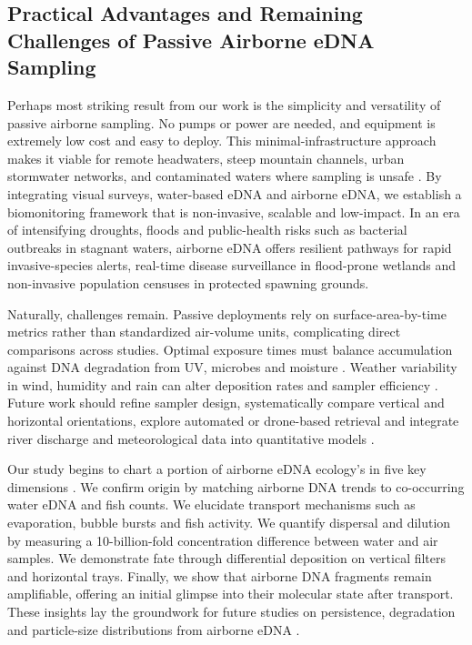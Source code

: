 \documentclass{article}
\begin{document}
\subsection{Practical Advantages and Remaining Challenges of Passive Airborne eDNA Sampling}
Perhaps most striking result from our work is the simplicity and versatility of passive airborne sampling. No pumps or power are needed, and equipment is extremely low cost and easy to deploy. This minimal-infrastructure approach makes it viable for remote headwaters, steep mountain channels, urban stormwater networks, and contaminated waters where sampling is unsafe \cite{harrison2019,bagley2019}. By integrating visual surveys, water-based eDNA and airborne eDNA, we establish a biomonitoring framework that is non-invasive, scalable and low-impact. In an era of intensifying droughts, floods and public-health risks such as bacterial outbreaks in stagnant waters, airborne eDNA offers resilient pathways for rapid invasive-species alerts, real-time disease surveillance in flood-prone wetlands and non-invasive population censuses in protected spawning grounds.

Naturally, challenges remain. Passive deployments rely on surface-area-by-time metrics rather than standardized air-volume units, complicating direct comparisons across studies. Optimal exposure times must balance accumulation against DNA degradation from UV, microbes and moisture \cite{brandao-dias2023}. Weather variability in wind, humidity and rain can alter deposition rates and sampler efficiency \cite{johnson2023,johnson2024}. Future work should refine sampler design, systematically compare vertical and horizontal orientations, explore automated or drone-based retrieval and integrate river discharge and meteorological data into quantitative models \cite{galban2021,kirchgeorg2024,shogren2017,wood2021}.

Our study begins to chart a portion of airborne eDNA ecology's in five key dimensions \cite{johnson2024}. We confirm origin by matching airborne DNA trends to co-occurring water eDNA and fish counts. We elucidate transport mechanisms such as evaporation, bubble bursts and fish activity. We quantify dispersal and dilution by measuring a 10-billion-fold concentration difference between water and air samples. We demonstrate fate through differential deposition on vertical filters and horizontal trays. Finally, we show that airborne DNA fragments remain amplifiable, offering an initial glimpse into their molecular state after transport. These insights lay the groundwork for future studies on persistence, degradation and particle-size distributions from airborne eDNA \cite{brandao-dias2025a}.
\end{document}
